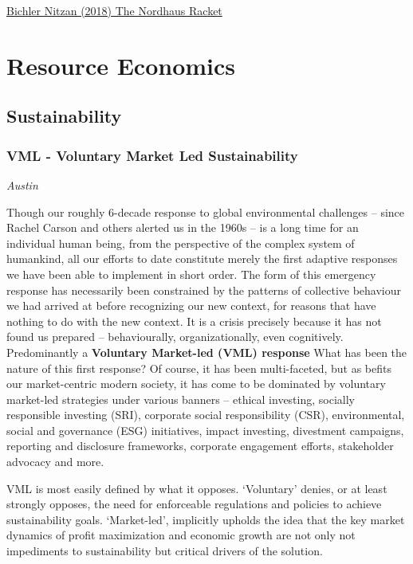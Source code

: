 \documentclass[
]{book}
\begin{document}
\href{https://rwer.wordpress.com/2018/11/05/the-nordhaus-racket-how-to-use-capitalization-to-minimize-the-cost-of-climate-change-and-win-a-nobel-for-sustainable-growth/}{Bichler Nitzan (2018) The Nordhaus Racket}

\hypertarget{resource-economics}{%
\chapter{Resource Economics}\label{resource-economics}}

\hypertarget{sustainability}{%
\section{Sustainability}\label{sustainability}}

\hypertarget{vml---voluntary-market-led-sustainability}{%
\subsection{VML - Voluntary Market Led Sustainability}\label{vml---voluntary-market-led-sustainability}}

\emph{Austin}

Though our roughly 6-decade response to global environmental challenges -- since
Rachel Carson and others alerted us in the 1960s -- is a long time for an individual human being, from
the perspective of the complex system of humankind, all our efforts to date constitute merely the
first adaptive responses we have been able to implement in short order. The form of this emergency
response has necessarily been constrained by the patterns of collective behaviour we had arrived at
before recognizing our new context, for reasons that have nothing to do with the new context. It is a
crisis precisely because it has not found us prepared -- behaviourally, organizationally, even
cognitively.
Predominantly a \textbf{Voluntary Market-led (VML) response}
What has been the nature of this first response? Of course, it has been multi-faceted, but as befits our
market-centric modern society, it has come to be dominated by voluntary market-led strategies
under various banners -- ethical investing, socially responsible investing (SRI), corporate social
responsibility (CSR), environmental, social and governance (ESG) initiatives, impact investing,
divestment campaigns, reporting and disclosure frameworks, corporate engagement efforts,
stakeholder advocacy and more.

VML is most easily defined by what it opposes. `Voluntary' denies, or at least strongly opposes, the
need for enforceable regulations and policies to achieve sustainability goals. `Market-led', implicitly
upholds the idea that the key market dynamics of profit maximization and economic growth are not
only not impediments to sustainability but critical drivers of the solution.
\end{document}
